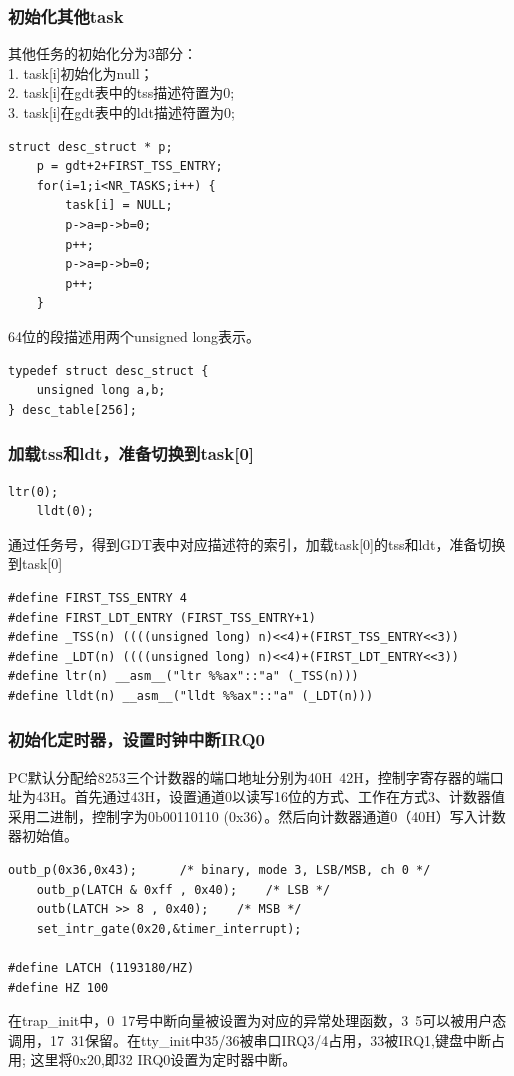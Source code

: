 \documentclass[12pt]{article}
\begin{document}
\subsubsection{初始化其他task}
其他任务的初始化分为3部分：\\
1. task[i]初始化为null；\\
2. task[i]在gdt表中的tss描述符置为0;\\
3. task[i]在gdt表中的ldt描述符置为0;
\begin{lstlisting}[breaklines]
	struct desc_struct * p;
	p = gdt+2+FIRST_TSS_ENTRY;
	for(i=1;i<NR_TASKS;i++) {
		task[i] = NULL;
		p->a=p->b=0;
		p++;
		p->a=p->b=0;
		p++;
	}
\end{lstlisting}
64位的段描述用两个unsigned long表示。
\begin{lstlisting}[breaklines]
typedef struct desc_struct {
	unsigned long a,b;
} desc_table[256];
\end{lstlisting}
\subsubsection{加载tss和ldt，准备切换到task[0]}
\begin{lstlisting}[breaklines]
	ltr(0);
	lldt(0);
\end{lstlisting}
通过任务号，得到GDT表中对应描述符的索引，加载task[0]的tss和ldt，准备切换到task[0]
\begin{lstlisting}[breaklines]
#define FIRST_TSS_ENTRY 4
#define FIRST_LDT_ENTRY (FIRST_TSS_ENTRY+1)
#define _TSS(n) ((((unsigned long) n)<<4)+(FIRST_TSS_ENTRY<<3))
#define _LDT(n) ((((unsigned long) n)<<4)+(FIRST_LDT_ENTRY<<3))
#define ltr(n) __asm__("ltr %%ax"::"a" (_TSS(n)))
#define lldt(n) __asm__("lldt %%ax"::"a" (_LDT(n)))
\end{lstlisting}
\subsubsection{初始化定时器，设置时钟中断IRQ0}
PC默认分配给8253三个计数器的端口地址分别为40H~42H，控制字寄存器的端口址为43H。首先通过43H，设置通道0以读写16位的方式、工作在方式3、计数器值采用二进制，控制字为0b00110110 (0x36）。然后向计数器通道0（40H）写入计数器初始值。
\begin{lstlisting}[breaklines]
	outb_p(0x36,0x43);		/* binary, mode 3, LSB/MSB, ch 0 */
	outb_p(LATCH & 0xff , 0x40);	/* LSB */
	outb(LATCH >> 8 , 0x40);	/* MSB */
	set_intr_gate(0x20,&timer_interrupt);
	
#define LATCH (1193180/HZ)
#define HZ 100	
\end{lstlisting}
在trap\_init中，0~17号中断向量被设置为对应的异常处理函数，3~5可以被用户态调用，17~31保留。在tty\_init中35/36被串口IRQ3/4占用，33被IRQ1,键盘中断占用; 这里将0x20,即32 IRQ0设置为定时器中断。
\end{document}
